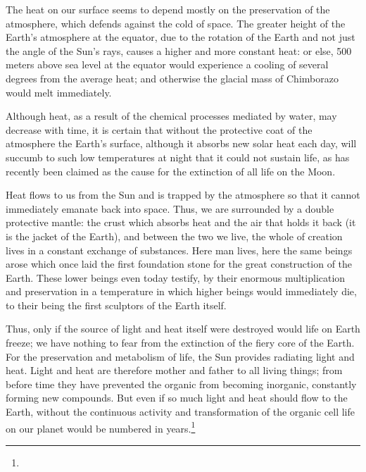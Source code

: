\documentclass[a4paper, 12pt, oneside]{article}
\begin{document}
The heat on our surface seems to depend mostly on the preservation of the atmosphere, which defends against the cold of space. The greater height of the Earth's atmosphere at the equator, due to the rotation of the Earth and not just the angle of the Sun's rays, causes a higher and more constant heat: or else, 500 meters above sea level at the equator would experience a cooling of several degrees from the average heat; and otherwise the glacial mass of Chimborazo would melt immediately.

Although heat, as a result of the chemical processes mediated by water, may decrease with time, it is certain that without the protective coat of the atmosphere the Earth's surface, although it absorbs new solar heat each day, will succumb to such low temperatures at night that it could not sustain life, as has recently been claimed as the cause for the extinction of all life on the Moon.

Heat flows to us from the Sun and is trapped by the atmosphere so that it cannot immediately emanate back into space. Thus, we are surrounded by a double protective mantle: the crust which absorbs heat and the air that holds it back (it is the jacket of the Earth), and between the two we live, the whole of creation lives in a constant exchange of substances. Here man lives, here the same beings arose which once laid the first foundation stone for the great construction of the Earth. These lower beings even today testify, by their enormous multiplication and preservation in a temperature in which higher beings would immediately die, to their being the first sculptors of the Earth itself.

Thus, only if the source of light and heat itself were destroyed would life on Earth freeze; we have nothing to fear from the extinction of the fiery core of the Earth. For the preservation and metabolism of life, the Sun provides radiating light and heat. Light and heat are therefore mother and father to all living things; from before time they have prevented the organic from becoming inorganic, constantly forming new compounds. But even if so much light and heat should flow to the Earth, without the continuous activity and transformation of the organic cell life on our planet would be numbered in years.\footnote{}
\end{document}
